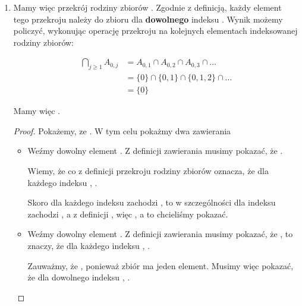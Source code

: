 \begin{example}
\begin{enumerate}
    \item {}
    
   Mamy więc przekrój rodziny zbiorów . Zgodnie z definicją, każdy element tego przekroju należy do zbioru  dla \textbf{dowolnego} indeksu . Wynik możemy policzyć, wykonując operację przekroju na kolejnych elementach indeksowanej rodziny zbiorów:
    
    \[
        \begin{split}
            \bigcap\limits_{j \geq 1} A_{0,j}
            &= A_{0,1} \cap A_{0,2} \cap A_{0,3} \cap \dots
            \\&= \{ 0 \} \cap \{ 0, 1 \} \cap \{ 0,1,2 \} \cap \dots
            \\&= \{ 0 \}
        \end{split}
    \]
    
    Mamy więc . 
    \begin{proof}
    Pokażemy, ze  . W tym celu pokażmy dwa zawierania
    \begin{itemize}
        \item {}
        
        Weźmy dowolny element . Z definicji zawierania musimy pokazać, że . 
        
        Wiemy, że  co z definicji przekroju rodziny zbiorów oznacza, że dla każdego indeksu , .
        
        Skoro dla każdego indeksu  zachodzi , to w szczególności dla indeksu  zachodzi , a z definicji , więc , a to chcieliśmy pokazać.
        
        \item {}
        
        Weźmy dowolny element . Z definicji zawierania musimy pokazać, że , to znaczy, że dla każdego indeksu , .
        
        Zauważmy, że , ponieważ zbiór  ma jeden element. Musimy więc pokazać, że dla dowolnego indeksu , .
        

\end{itemize}
\end{proof}
\end{enumerate}
\end{example}
